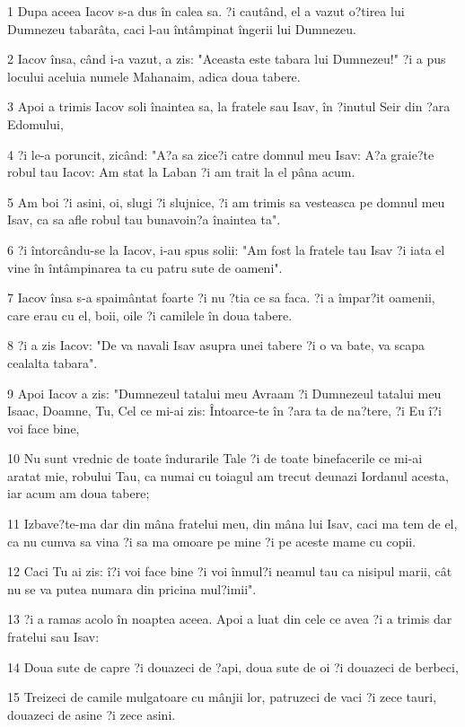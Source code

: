 \par 1 Dupa aceea Iacov s-a dus în calea sa. ?i cautând, el a vazut o?tirea lui Dumnezeu tabarâta, caci l-au întâmpinat îngerii lui Dumnezeu.
\par 2 Iacov însa, când i-a vazut, a zis: "Aceasta este tabara lui Dumnezeu!" ?i a pus locului aceluia numele Mahanaim, adica doua tabere.
\par 3 Apoi a trimis Iacov soli înaintea sa, la fratele sau Isav, în ?inutul Seir din ?ara Edomului,
\par 4 ?i le-a poruncit, zicând: "A?a sa zice?i catre domnul meu Isav: A?a graie?te robul tau Iacov: Am stat la Laban ?i am trait la el pâna acum.
\par 5 Am boi ?i asini, oi, slugi ?i slujnice, ?i am trimis sa vesteasca pe domnul meu Isav, ca sa afle robul tau bunavoin?a înaintea ta".
\par 6 ?i întorcându-se la Iacov, i-au spus solii: "Am fost la fratele tau Isav ?i iata el vine în întâmpinarea ta cu patru sute de oameni".
\par 7 Iacov însa s-a spaimântat foarte ?i nu ?tia ce sa faca. ?i a împar?it oamenii, care erau cu el, boii, oile ?i camilele în doua tabere.
\par 8 ?i a zis Iacov: "De va navali Isav asupra unei tabere ?i o va bate, va scapa cealalta tabara".
\par 9 Apoi Iacov a zis: "Dumnezeul tatalui meu Avraam ?i Dumnezeul tatalui meu Isaac, Doamne, Tu, Cel ce mi-ai zis: Întoarce-te în ?ara ta de na?tere, ?i Eu î?i voi face bine,
\par 10 Nu sunt vrednic de toate îndurarile Tale ?i de toate binefacerile ce mi-ai aratat mie, robului Tau, ca numai cu toiagul am trecut deunazi Iordanul acesta, iar acum am doua tabere;
\par 11 Izbave?te-ma dar din mâna fratelui meu, din mâna lui Isav, caci ma tem de el, ca nu cumva sa vina ?i sa ma omoare pe mine ?i pe aceste mame cu copii.
\par 12 Caci Tu ai zis: î?i voi face bine ?i voi înmul?i neamul tau ca nisipul marii, cât nu se va putea numara din pricina mul?imii".
\par 13 ?i a ramas acolo în noaptea aceea. Apoi a luat din cele ce avea ?i a trimis dar fratelui sau Isav:
\par 14 Doua sute de capre ?i douazeci de ?api, doua sute de oi ?i douazeci de berbeci,
\par 15 Treizeci de camile mulgatoare cu mânjii lor, patruzeci de vaci ?i zece tauri, douazeci de asine ?i zece asini.

